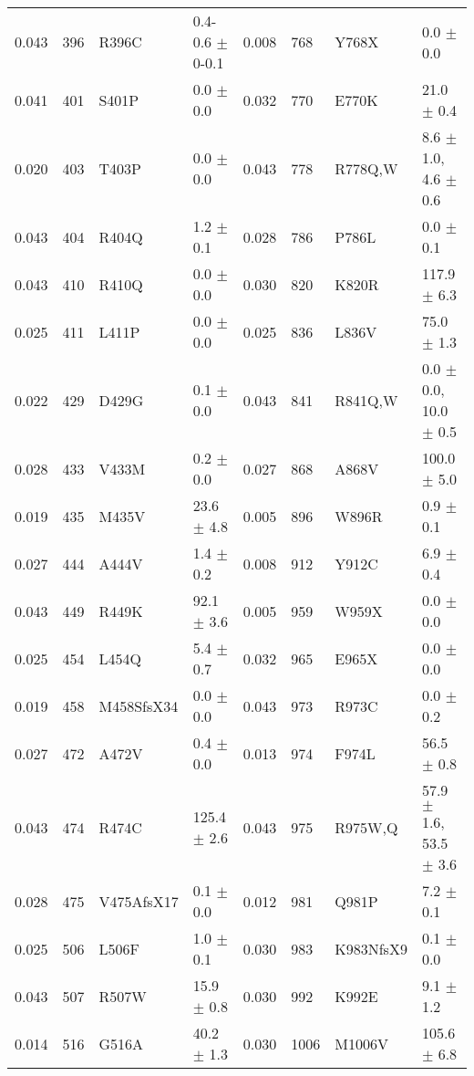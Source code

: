 \documentclass[preprint,11pt,fleqn]{elsarticle}
\begin{document}
\begin{tiny}
\begin{tabularx}{\textwidth}{*{8}{Z}}
{0.043} & {396} & {R396C} & {0.4-0.6 $\pm$ 0-0.1} & {0.008} & {768} & {Y768X} & {0.0 $\pm$ 0.0} \\
{0.041} & {401} & {S401P} & {0.0 $\pm$ 0.0} & {0.032} & {770} & {E770K} & {21.0 $\pm$ 0.4} \\
{0.020} & {403} & {T403P} & {0.0 $\pm$ 0.0} & {0.043} & {778} & {R778Q,W} & {8.6 $\pm$ 1.0, 4.6 $\pm$ 0.6} \\
{0.043} & {404} & {R404Q} & {1.2 $\pm$ 0.1} & {0.028} & {786} & {P786L} & {0.0 $\pm$ 0.1} \\
{0.043} & {410} & {R410Q} & {0.0 $\pm$ 0.0} & {0.030} & {820} & {K820R} & {117.9 $\pm$ 6.3} \\
{0.025} & {411} & {L411P} & {0.0 $\pm$ 0.0} & {0.025} & {836} & {L836V} & {75.0 $\pm$ 1.3} \\
{0.022} & {429} & {D429G} & {0.1 $\pm$ 0.0} & {0.043} & {841} & {R841Q,W} & {0.0 $\pm$ 0.0, 10.0 $\pm$ 0.5} \\
{0.028} & {433} & {V433M} & {0.2 $\pm$ 0.0} & {0.027} & {868} & {A868V} & {100.0 $\pm$ 5.0} \\
{0.019} & {435} & {M435V} & {23.6 $\pm$ 4.8} & {0.005} & {896} & {W896R} & {0.9 $\pm$ 0.1} \\
{0.027} & {444} & {A444V} & {1.4 $\pm$ 0.2} & {0.008} & {912} & {Y912C} & {6.9 $\pm$ 0.4} \\
{0.043} & {449} & {R449K} & {92.1 $\pm$ 3.6} & {0.005} & {959} & {W959X} & {0.0 $\pm$ 0.0} \\
{0.025} & {454} & {L454Q} & {5.4 $\pm$ 0.7} & {0.032} & {965} & {E965X} & {0.0 $\pm$ 0.0} \\
{0.019} & {458} & {M458SfsX34} & {0.0 $\pm$ 0.0} & {0.043} & {973} & {R973C} & {0.0 $\pm$ 0.2} \\
{0.027} & {472} & {A472V} & {0.4 $\pm$ 0.0} & {0.013} & {974} & {F974L} & {56.5 $\pm$ 0.8} \\
{0.043} & {474} & {R474C} & {125.4 $\pm$ 2.6} & {0.043} & {975} & {R975W,Q} & {57.9 $\pm$ 1.6, 53.5 $\pm$ 3.6} \\
{0.028} & {475} & {V475AfsX17} & {0.1 $\pm$ 0.0} & {0.012} & {981} & {Q981P} & {7.2 $\pm$ 0.1} \\
{0.025} & {506} & {L506F} & {1.0 $\pm$ 0.1} & {0.030} & {983} & {K983NfsX9} & {0.1 $\pm$ 0.0} \\
{0.043} & {507} & {R507W} & {15.9 $\pm$ 0.8} & {0.030} & {992} & {K992E} & {9.1 $\pm$ 1.2} \\
{0.014} & {516} & {G516A} & {40.2 $\pm$ 1.3} &	{0.030} & {1006} & {M1006V} & {105.6 $\pm$ 6.8} \\

\end{tabularx}
\end{tiny}
\end{document}
